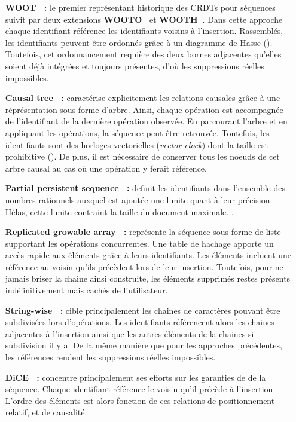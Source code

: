 \begin{itemize}
\item [\textbf{WOOT~\cite{oster2006data} :}] le premier représentant historique
  des CRDTs pour séquences suivit par deux extensions
  \textbf{WOOTO~\cite{weiss2007wooki}} et
  \textbf{WOOTH~\cite{ahmed2011evaluating}}. Dans cette approche chaque
  identifiant référence les identifiants voisins à l'insertion. Rassemblés, les
  identifiants peuvent être ordonnés grâce à un diagramme de Hasse
  (\REF). Toutefois, cet ordonnancement requière des deux bornes adjacentes
  qu'elles soient déjà intégrées et toujours présentes, d'où les suppressions
  réelles impossibles.
\item [\textbf{Causal tree~\cite{grishchenko2010deep} :}] caractérise
  explicitement les relations causales grâce à une réprésentation sous forme
  d'arbre. Ainsi, chaque opération est accompagnée de l'identifiant de la
  dernière opération observée. En parcourant l'arbre et en appliquant les
  opérations, la séquence peut être retrouvée. Toutefois, les identifiants sont
  des horloges vectorielles (\emph{vector clock}) dont la taille est prohibitive
  (\REF). De plus, il est nécessaire de conserver tous les noeuds de cet arbre
  causal au cas où une opération y ferait référence.
\item [\textbf{Partial persistent sequence~\cite{wu2010partial} :}] definit les
  identifiants dans l'ensemble des nombres rationnels auxquel est ajoutée une
  limite quant à leur précision. Hélas, cette limite contraint la taille du
  document maximale. . 
\item [\textbf{Replicated growable array~\cite{roh2011replicated} :}] représente
  la séquence sous forme de liste supportant les opérations concurrentes. Une
  table de hachage apporte un accès rapide aux éléments grâce à leurs
  identifiants. Les éléments incluent une référence au voisin qu'ils précèdent
  lors de leur insertion. Toutefois, pour ne jamais briser la chaine ainsi
  construite, les éléments supprimés restes présents indéfinitivement mais
  cachés de l'utilisateur. 
\item [\textbf{String-wise~\cite{yu2012stringwise} :}] cible principalement les
  chaines de caractères pouvant être subdivisées lors d'opérations. Les
  identifiants référencent alors les chaines adjacentes à l'insertion ainsi que
  les autres éléments de la chaines si subdivision il y a. De la même manière
  que pour les approches précédentes, les références rendent les suppressions
  réelles impossibles.
\item [\textbf{DiCE~\cite{conway2014language} :}] concentre principalement ses
  efforts sur les garanties de  de la séquence. Chaque
  identifiant référence le voisin qu'il précède à l'insertion. L'ordre des
  éléments est alors fonction de ces relations de positionnement relatif, et de
  causalité.
\end{itemize}

